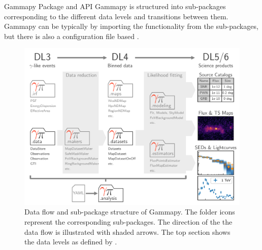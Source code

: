 \documentclass[
    final,
    ]{beamer}
\newlength{\colwidth}
\newcommand{\coloredhref}[3][blue]{\href{#2}{\color{#1}{#3}}}%
\begin{document}
\begin{frame}[t, fragile]
\begin{columns}[t]
\begin{column}{\colwidth}
  \begin{block}{Gammapy Package and API}
  Gammapy is structured into sub-packages corresponding to the different data levels and transitions between them. Gammapy can be typically \coloredhref[pink]{https://docs.gammapy.org/0.18.2/tutorials/analysis_2.html}{used as a standard Python library} by importing the functionality from the sub-packages, but there is also a configuration file based \coloredhref[pink]{https://docs.gammapy.org/0.18.2/tutorials/analysis_1.html}{high level analysis API}.
    \begin{figure}
      \centering
      \includegraphics[width=\textwidth]{figures/data-flow-gammapy.pdf}
      \caption{Data flow and sub-package structure of Gammapy. The folder icons represent the corresponding sub-packages. The direction of the the data flow is illustrated with shaded arrows. The top section shows the data levels as defined by \coloredhref[pink]{https://www.cta-observatory.org}{CTA}.}
    \end{figure}


  \end{block}




\end{column}
\end{columns}
\end{frame}
\end{document}
